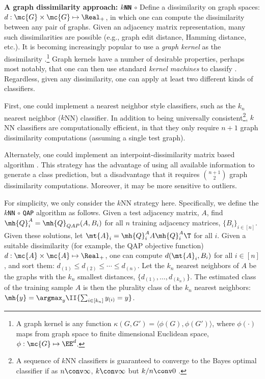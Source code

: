 \documentclass[10pt,journal,cspaper,compsoc]{IEEEtran}
\begin{document}
\textbf{A graph dissimilarity approach: \texttt{$k$NN} $\circ$ \qap} %
Define a dissimilarity on graph spaces: $d: \mc{G} \times \mc{G} \mapsto \Real_+$, in which one can compute the dissimilarity between any pair of graphs. Given an adjacency matrix representation, many such dissimilarities are possible (e.g., graph edit distance, Hamming distance, etc.).  It is becoming increasingly popular to use a \emph{graph kernel} as the dissimilarity \cite{Bunke2011}.\footnote{A graph kernel is any function $\kappa(G,G')=\langle \phi(G), \phi(G') \rangle$, where $\phi(\cdot)$ maps from graph space to finite dimensional Euclidean space, $\phi: \mc{G} \mapsto \EE^d$.}  Graph kernels have a number of desirable properties, perhaps most notably, that one can then use standard \emph{kernel machines} to classify \cite{Vapnik1998}.	Regardless, given any dissimilarity, one can apply at least two different kinds of classifiers.


First, one could implement a nearest neighbor style classifiers, such as the $k_n$ nearest neighbor ($k$NN) classifier.  In addition to being universally consistent\footnote{A sequence of $k$NN classifiers is guaranteed to converge to the Bayes optimal classifier  if  as $n \conv \infty$, $k \conv \infty$ but $k/n \conv 0$ \cite{Devroye1997}.}, $k$NN classifiers are computationally efficient, in that they only require $n+1$ graph dissimilarity computations (assuming a single test graph).  

Alternately, one could implement an interpoint-dissimilarity matrix based algorithm \cite{Duin2011}. This strategy has the advantage of using all available information to generate a class prediction, but a disadvantage that it requires $\binom{n+1}{2}$ graph dissimilarity computations. Moreover, it may be more sensitive to outliers.

For simplicity, we only consider the $k$NN strategy here.  Specifically, we define the \texttt{$k$NN} $\circ$ \texttt{QAP} algorithm as follows. Given a test adjacency matrix, $A$, find $\mh{Q}_i^A=\mh{Q}_{QAP}(A,B_i)$ for all $n$ training adjacency matrices, $\{B_i\}_{i \in [n]}$.  Given these solutions, let $\mt{A}_i=\mh{Q}_i^A A {\mh{Q}_i^A}{}\T$ for all $i$. Given a suitable dissimilarity (for example, the QAP objective function) $d: \mc{A} \times \mc{A} \mapsto \Real_+$, one can compute $d(\mt{A}_i,B_i)$ for all $i \in [n]$, and sort them: $d_{(1)} \leq d_{(2)} \leq \cdots \leq d_{(n)}$.  Let the $k_n$ nearest neighbors of $A$ be the graphs with the $k_n$ smallest distances, $\{d_{(1)},\ldots, d_{(k_n)}\}$.  The estimated class of the training sample $A$ is then the plurality class of the $k_n$ nearest neighbors: $\mh{y}=\argmax_{y} \II\{\sum_{i \in [k_n]} y_{(i)} = y \}$. 
\end{document}
